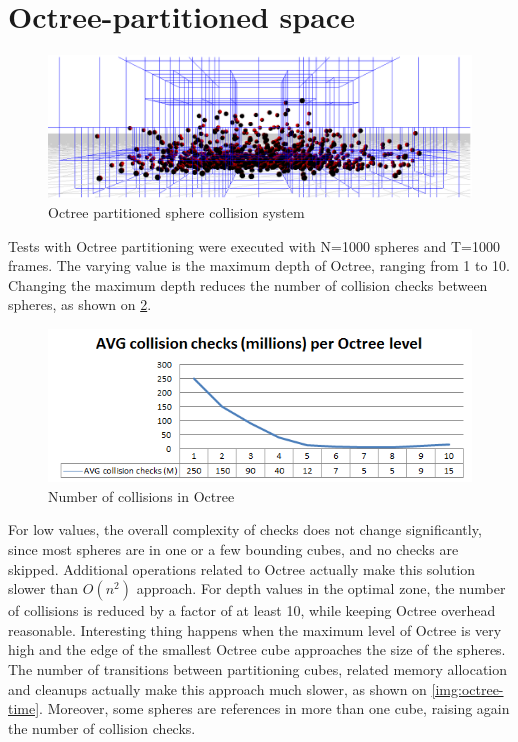 \section{Octree-partitioned space}
\label{sec:sphereoctree}

\begin{figure}[h!]
  \caption{Octree partitioned sphere collision system}
  \label{img:spheres}
  \centering
	\includegraphics[width=16cm]{spheres/render2.png}
\end{figure}

Tests with Octree partitioning were executed with N=1000 spheres and T=1000 frames. The varying value is the maximum depth of Octree, ranging from 1 to 10.
Changing the maximum depth reduces the number of collision checks between spheres, as shown on \ref{img:octree-collisions}.

\begin{figure}[h!]
  \caption{Number of collisions in Octree}
  \label{img:octree-collisions}
  \centering
	\includegraphics[width=16cm]{spheres/octree-collisions.png}
\end{figure}

For low values, the overall complexity of checks does not change significantly, since most spheres are in one or a few bounding cubes, and no checks are skipped. Additional operations related to Octree actually make this solution slower than $O(n^2)$ approach. For depth values in the optimal zone, the number of collisions is reduced by a factor of at least 10, while keeping Octree overhead reasonable. Interesting thing happens when the maximum level of Octree is very high and the edge of the smallest Octree cube approaches the size of the spheres. The number of transitions between partitioning cubes, related memory allocation and cleanups actually make this approach much slower, as shown on \ref{img:octree-time}. Moreover, some spheres are references in more than one cube, raising again the number of collision checks.

